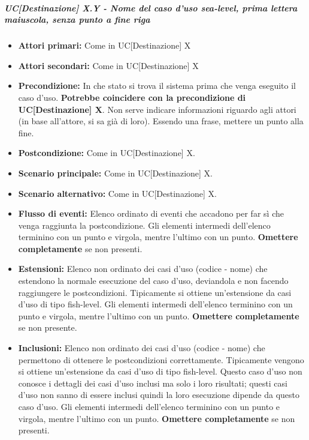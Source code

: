 \subparagraph{UC[Destinazione] X.Y - Nome del caso d'uso sea-level, prima lettera maiuscola, senza punto a fine riga}%
\begin{itemize}
	\item \textbf{Attori primari:} Come in UC[Destinazione] X
	\item \textbf{Attori secondari:} Come in UC[Destinazione] X
	\item \textbf{Precondizione:} In che stato si trova il sistema prima che venga eseguito il caso d'uso. \textbf{Potrebbe coincidere con la precondizione di UC[Destinazione] X}. Non serve indicare informazioni riguardo agli attori (in base all'attore, si sa già di loro). Essendo una frase, mettere un punto alla fine.
	\item \textbf{Postcondizione:} Come in UC[Destinazione] X.
	\item \textbf{Scenario principale:} Come in UC[Destinazione] X.
	\item \textbf{Scenario alternativo:} Come in UC[Destinazione] X.
	\item \textbf{Flusso di eventi:} Elenco ordinato di eventi che accadono per far sì che venga raggiunta la postcondizione. Gli elementi intermedi dell'elenco terminino con un punto e virgola, mentre l'ultimo con un punto. \textbf{Omettere completamente} se non presenti.
	\item \textbf{Estensioni:} Elenco non ordinato dei casi d'uso (codice - nome) che estendono la normale esecuzione del caso d'uso, deviandola e non facendo raggiungere le postcondizioni. Tipicamente si ottiene un'estensione da casi d'uso di tipo fish-level. Gli elementi intermedi dell'elenco terminino con un punto e virgola, mentre l'ultimo con un punto. \textbf{Omettere completamente} se non presente.
	\item \textbf{Inclusioni:} Elenco non ordinato dei casi d'uso (codice - nome) che permettono di ottenere le postcondizioni correttamente. Tipicamente vengono si ottiene un'estensione da casi d'uso di tipo fish-level. Questo caso d'uso non conosce i dettagli dei casi d'uso inclusi ma solo i loro risultati; questi casi d'uso non sanno di essere inclusi quindi la loro esecuzione dipende da questo caso d'uso. Gli elementi intermedi dell'elenco terminino con un punto e virgola, mentre l'ultimo con un punto.  \textbf{Omettere completamente} se non presenti.
\end{itemize}

